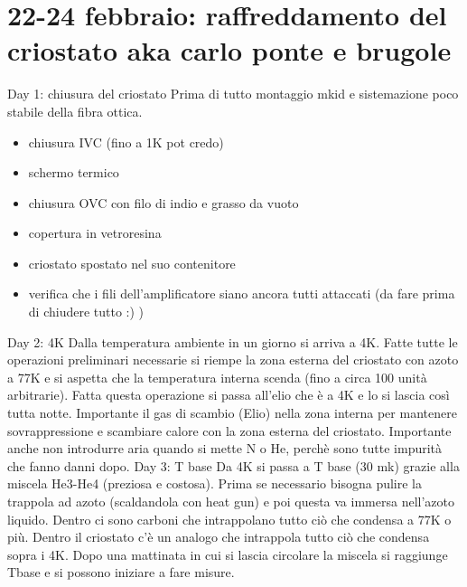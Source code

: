\documentclass{article}
\numberwithin{equation}{section}
\begin{document}
\section{22-24 febbraio: raffreddamento del criostato aka carlo ponte e brugole}
Day 1: chiusura del criostato
Prima di tutto montaggio mkid e sistemazione poco stabile della fibra ottica.
\begin{itemize}
    \item chiusura IVC (fino a 1K pot credo)
    \item schermo termico
    \item chiusura OVC con filo di indio e grasso da vuoto
    \item copertura in vetroresina
    \item criostato spostato nel suo contenitore
    \item verifica che i fili dell'amplificatore siano ancora tutti attaccati (da fare prima di chiudere tutto :) )
\end{itemize}
Day 2: 4K 
Dalla temperatura ambiente in un giorno si arriva a 4K. Fatte tutte le operazioni preliminari necessarie si riempe la zona esterna del criostato con azoto a 77K e si aspetta che la temperatura interna scenda (fino a circa 100 unità arbitrarie). Fatta questa operazione si passa all'elio che è a 4K e lo si lascia così tutta notte.
Importante il gas di scambio (Elio) nella zona interna per mantenere sovrappressione e scambiare calore con la zona esterna del criostato.
Importante anche non introdurre aria quando si mette N o He, perchè sono tutte impurità che fanno danni dopo. 
Day 3: T base
Da 4K si passa a T base (30 mk) grazie alla miscela He3-He4 (preziosa e costosa). Prima se necessario bisogna pulire la trappola ad azoto (scaldandola con heat gun) e poi questa va immersa nell'azoto liquido. Dentro ci sono carboni che intrappolano tutto ciò che condensa a 77K o più. Dentro il criostato c'è un analogo che intrappola tutto ciò che condensa sopra i 4K.
Dopo una mattinata in cui si lascia circolare la miscela si raggiunge Tbase e si possono iniziare a fare misure.
\end{document}
